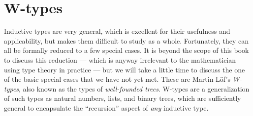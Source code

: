 %
%
%
%

\section{W-types}
\label{sec:w-types}

Inductive types are very general, which is excellent for their usefulness and applicability, but makes them difficult to study as a whole.
Fortunately, they can all be formally reduced to a few special cases.
It is beyond the scope of this book to discuss this reduction --- which is anyway irrelevant to the mathematician using type theory in practice --- but we will take a little time to discuss the one of the basic special cases that we have not yet met.
These are Martin-L{\"o}f's \emph{W-types}, also known as the types of \emph{well-founded trees}.
W-types are a generalization of such types as natural numbers, lists, and binary trees, which are sufficiently general to encapsulate the ``recursion'' aspect of \emph{any} inductive type.

